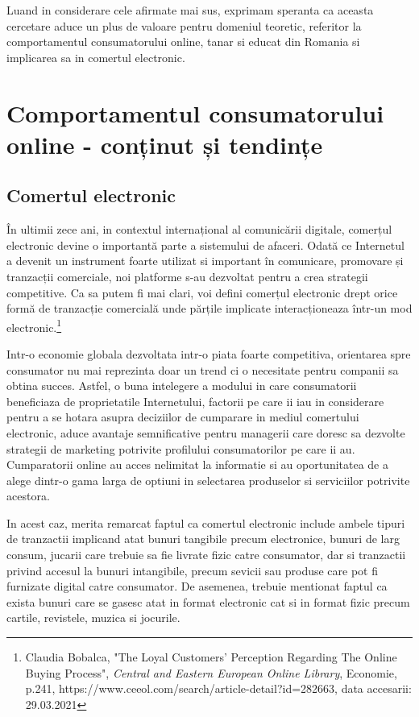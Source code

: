 \documentclass[a4paper, 12pt]{article}
\begin{document}
	\quad Luand in considerare cele afirmate mai sus, exprimam speranta ca aceasta cercetare aduce un plus de valoare pentru domeniul teoretic, referitor la comportamentul consumatorului online, tanar si educat din Romania si implicarea sa in comertul electronic.
		
\newpage
\setcounter{section}{0}
\section{ Comportamentul consumatorului online - conținut și tendințe}

\subsection{Comertul electronic}
\quad \quad\space În ultimii zece ani, in contextul internațional al comunicării digitale, comerțul electronic devine o importantă parte a sistemului de afaceri. Odată ce Internetul a devenit un instrument foarte utilizat si important în comunicare, promovare și tranzacții comerciale, noi platforme s-au dezvoltat pentru a crea strategii competitive. Ca sa putem fi mai clari, voi defini comerțul electronic drept orice formă de tranzacție comercială unde părțile implicate interacționeaza într-un mod electronic.\footnote{Claudia Bobalca, "The Loyal Customers’ Perception Regarding The Online
	Buying Process", \textit{Central and Eastern European Online Library}, Economie, p.241, https://www.ceeol.com/search/article-detail?id=282663, data accesarii: 29.03.2021}

\quad 
Intr-o economie globala dezvoltata intr-o piata foarte competitiva, orientarea spre consumator nu mai reprezinta doar un trend ci o necesitate pentru companii sa obtina succes. Astfel, o buna intelegere a modului in care consumatorii beneficiaza de proprietatile Internetului, factorii pe care ii iau in considerare pentru a se hotara asupra deciziilor de cumparare in mediul comertului electronic, aduce avantaje semnificative pentru managerii care doresc sa dezvolte strategii de marketing potrivite profilului consumatorilor pe care ii au. Cumparatorii online au acces nelimitat la informatie si au oportunitatea de a alege dintr-o gama larga de optiuni in selectarea produselor si serviciilor potrivite acestora.

\quad In acest caz, merita remarcat faptul ca comertul electronic include ambele tipuri de tranzactii implicand atat bunuri tangibile precum electronice, bunuri de larg consum, jucarii care trebuie sa fie livrate fizic catre consumator, dar si tranzactii privind accesul la bunuri intangibile, precum sevicii sau produse care pot fi furnizate digital catre consumator. De asemenea, trebuie mentionat faptul ca exista bunuri care se gasesc atat in format electronic cat si in format fizic precum cartile, revistele, muzica si jocurile.
\end{document}
